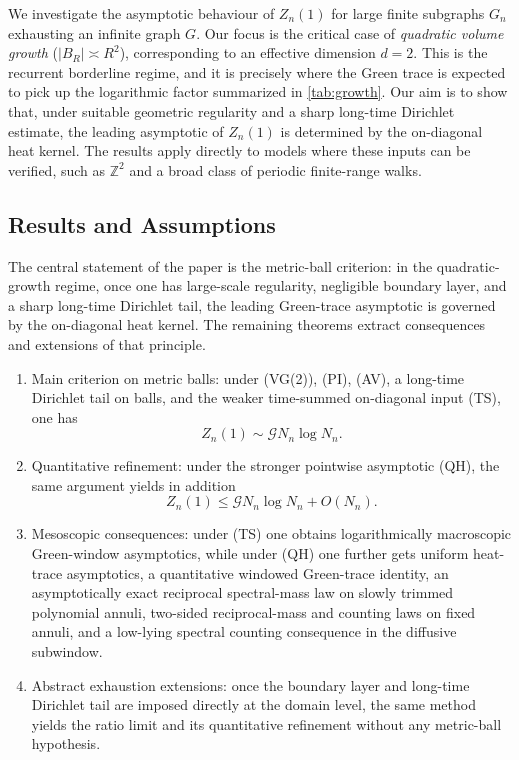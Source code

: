 \documentclass[reqno]{amsart}
\numberwithin{equation}{section}
\theoremstyle{definition}
\theoremstyle{remark}
\newcommand{\Cref}[1]{\autoref{#1}}
\newcommand{\cG}{\mathcal{G}}
\begin{document}
We investigate the asymptotic behaviour of $Z_n(1)$ for large finite subgraphs $G_n$ exhausting an infinite graph $G$. Our focus is the critical case of \emph{quadratic volume growth} ($|B_R| \asymp R^2$), corresponding to an effective dimension $d=2$. This is the recurrent borderline regime, and it is precisely where the Green trace is expected to pick up the logarithmic factor summarized in \Cref{tab:growth}. Our aim is to show that, under suitable geometric regularity and a sharp long-time Dirichlet estimate, the leading asymptotic of $Z_n(1)$ is determined by the on-diagonal heat kernel. The results apply directly to models where these inputs can be verified, such as $\mathbb Z^2$ and a broad class of periodic finite-range walks.

\subsection{Results and Assumptions}
The central statement of the paper is the metric-ball criterion: in the quadratic-growth regime, once one has large-scale regularity, negligible boundary layer, and a sharp long-time Dirichlet tail, the leading Green-trace asymptotic is governed by the on-diagonal heat kernel. The remaining theorems extract consequences and extensions of that principle.
\begin{enumerate}
  \item Main criterion on metric balls: under \textup{(VG(2))}, \textup{(PI)}, \textup{(AV)}, a long-time Dirichlet tail on balls, and the weaker time-summed on-diagonal input \textup{(TS)}, one has
  \[
    Z_n(1)\sim \cG N_n\log N_n.
  \]
  \item Quantitative refinement: under the stronger pointwise asymptotic \textup{(QH)}, the same argument yields in addition
  \[
    Z_n(1)\le \cG N_n\log N_n+O(N_n).
  \]
  \item Mesoscopic consequences: under \textup{(TS)} one obtains logarithmically macroscopic Green-window asymptotics, while under \textup{(QH)} one further gets uniform heat-trace asymptotics, a quantitative windowed Green-trace identity, an asymptotically exact reciprocal spectral-mass law on slowly trimmed polynomial annuli, two-sided reciprocal-mass and counting laws on fixed annuli, and a low-lying spectral counting consequence in the diffusive subwindow.
  \item Abstract exhaustion extensions: once the boundary layer and long-time Dirichlet tail are imposed directly at the domain level, the same method yields the ratio limit and its quantitative refinement without any metric-ball hypothesis.
\end{enumerate}
\end{document}
